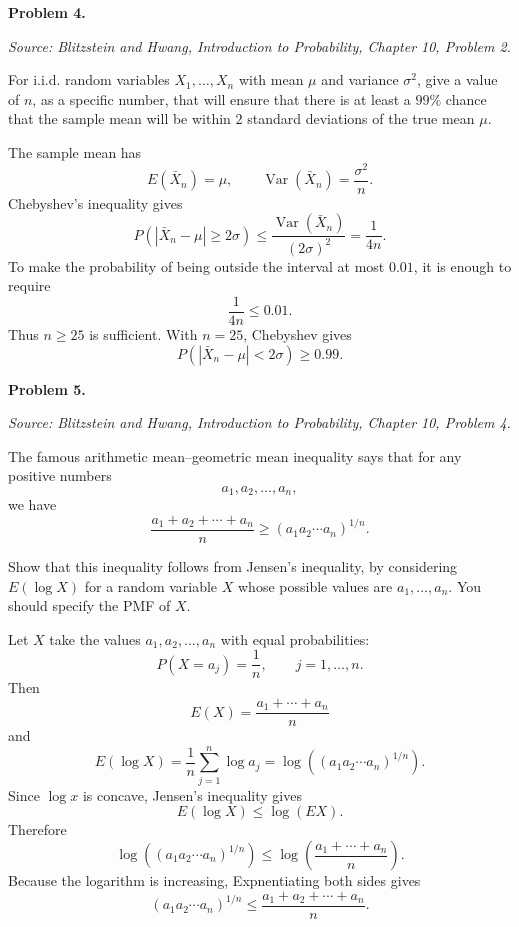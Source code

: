 \documentclass[11pt]{article}
\newcommand{\Var}{\operatorname{Var}}
\newcommand{\source}[2]{%
    \vspace{0.15cm}
    {\small\textit{Source: Blitzstein and Hwang, \textit{Introduction to Probability}, Chapter #1, Problem #2.}}
}
\begin{document}
 


\begin{problemheader}
\textbf{Problem 4. }
\end{problemheader}
\source{10}{2}

For i.i.d. random variables $X_1,\dots,X_n$ with mean $\mu$ and variance $\sigma^2$, give a value of $n$, as a specific number, that will ensure that there is at least a $99\%$ chance that the sample mean will be within $2$ standard deviations of the true mean $\mu$.

\begin{solutionbox}
The sample mean has
\[
E(\bar X_n)=\mu,
\qquad
\Var(\bar X_n)=\frac{\sigma^2}{n}.
\]
Chebyshev's inequality gives
\[
P(|\bar X_n-\mu|\ge 2\sigma)
\le
\frac{\Var(\bar X_n)}{(2\sigma)^2}
=
\frac{1}{4n}.
\]
To make the probability of being outside the interval at most $0.01$, it is enough to require
\[
\frac{1}{4n}\le0.01.
\]
Thus $n\ge25$ is sufficient. With $n=25$, Chebyshev gives
\[
P(|\bar X_n-\mu|<2\sigma)\ge 0.99.
\]

 
\end{solutionbox}
\newpage


\begin{problemheader}
\textbf{Problem 5. }
\end{problemheader}
\source{10}{4}

The famous arithmetic mean--geometric mean inequality says that for any positive numbers
\[
a_1,a_2,\dots,a_n,
\]
we have
\[
\frac{a_1+a_2+\cdots+a_n}{n}
\ge
(a_1a_2\cdots a_n)^{1/n}.
\]

Show that this inequality follows from Jensen's inequality, by considering $E(\log X)$ for a random variable $X$ whose possible values are $a_1,\dots,a_n$. You should specify the PMF of $X$.

\begin{solutionbox}
Let $X$ take the values $a_1,a_2,\dots,a_n$ with equal probabilities:
\[
P(X=a_j)=\frac1n,
\qquad j=1,\dots,n.
\]
Then
\[
E(X)=\frac{a_1+\cdots+a_n}{n}
\]
and
\[
E(\log X)=\frac1n\sum_{j=1}^n \log a_j
=
\log\left((a_1a_2\cdots a_n)^{1/n}\right).
\]
Since $\log x$ is concave, Jensen's inequality gives
\[
E(\log X)\le \log(E X).
\]
Therefore
\[
\log\left((a_1a_2\cdots a_n)^{1/n}\right)
\le
\log\left(\frac{a_1+\cdots+a_n}{n}\right).
\]
Because the logarithm is increasing, Expnentiating both sides gives
\[
(a_1a_2\cdots a_n)^{1/n}
\le
\frac{a_1+a_2+\cdots+a_n}{n}.
\]
 
\end{solutionbox}
\newpage
\end{document}
